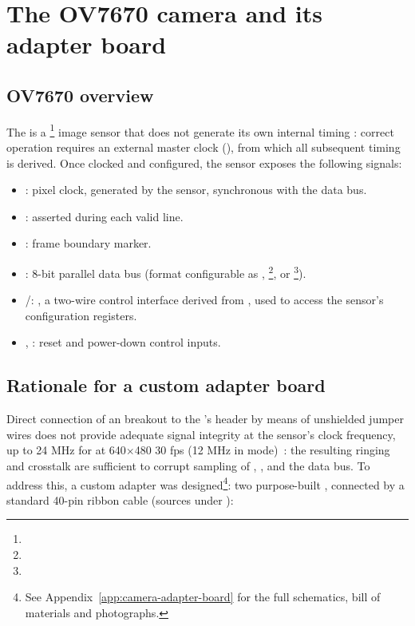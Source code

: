\section{The OV7670 camera and its adapter board}

\subsection{OV7670 overview}

The  is a  \footnote{} image sensor that does not generate its own internal timing \cite{OV7670-DS}: correct operation requires an external master clock (), from which all subsequent timing is derived. Once clocked and configured, the sensor exposes the following signals:

\begin{itemize}
    \item {}: pixel clock, generated by the sensor, synchronous with the data bus.
    \item {}: asserted during each valid line.
    \item {}: frame boundary marker.
    \item {}: 8-bit parallel data bus (format configurable as , \footnote{}, or \footnote{}).
    \item {}/: , a two-wire control interface derived from , used to access the sensor's configuration registers.
    \item {}, : reset and power-down control inputs.
\end{itemize}

\subsection{Rationale for a custom adapter board}

Direct connection of an  breakout to the 's  header by means of unshielded jumper wires does not provide adequate signal integrity at the sensor's clock frequency, up to 24 MHz for  at 640$\times$480 30 fps (12 MHz in  mode)~\cite[Table 3-3]{OV7670-IG}: the resulting ringing and crosstalk are sufficient to corrupt sampling of , , and the data bus. To address this, a custom adapter was designed\footnote{See Appendix~\ref{app:camera-adapter-board} for the full schematics, bill of materials and photographs.}: two purpose-built , connected by a standard 40-pin  ribbon cable (sources under ):

